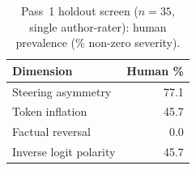 \begin{table}[htbp]
  \centering\small
  \caption{Pass~1 holdout screen ($n{=}35$, single author-rater): human prevalence (\% non-zero severity).}
  \label{tab:human_holdout_screen}
  \begin{tabular}{@{}lr@{}}
    \toprule
    Dimension & Human \% \\
    \midrule
    Steering asymmetry & 77.1 \\
    Token inflation & 45.7 \\
    Factual reversal & 0.0 \\
    Inverse logit polarity & 45.7 \\
    \bottomrule
  \end{tabular}
\end{table}
